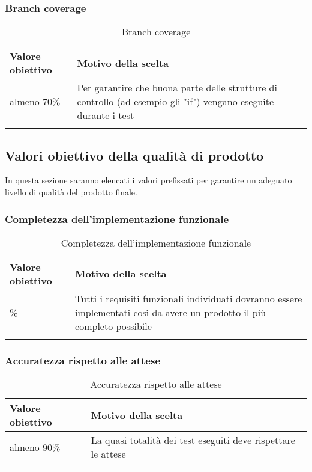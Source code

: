 \documentclass[../PianoDiQualifica_v3.0.0.tex]{subfiles}
\begin{document}
		\subsubsection{Branch coverage}
			\begin{longtable}[c] { >{\centering\arraybackslash}p{4cm} p{7cm} }
				\toprule
				\centerline{\textbf{Valore obiettivo}} & \centerline{\textbf{Motivo della scelta}} \\
				\midrule
					almeno 70\% & Per garantire che buona parte delle strutture di controllo (ad esempio gli "if") vengano eseguite durante i test \\
				\bottomrule
				\caption{Branch coverage}
			\end{longtable}


	\subsection{Valori obiettivo della qualità di prodotto}
		In questa sezione saranno elencati i valori prefissati per garantire un adeguato livello di qualità del prodotto finale.

		\subsubsection{Completezza dell'implementazione funzionale}
			\begin{longtable}[c] { >{\centering\arraybackslash}p{4cm} p{7cm} }
				\toprule
				\centerline{\textbf{Valore obiettivo}} & \centerline{\textbf{Motivo della scelta}} \\
				\midrule
					100\% &	Tutti i requisiti funzionali individuati dovranno essere implementati così da avere un prodotto il più completo possibile\\
				\bottomrule
				\caption{Completezza dell'implementazione funzionale}
			\end{longtable}

		\subsubsection{Accuratezza rispetto alle attese}
			\begin{longtable}[c] { >{\centering\arraybackslash}p{4cm} p{7cm} }
				\toprule
				\centerline{\textbf{Valore obiettivo}} & \centerline{\textbf{Motivo della scelta}} \\
				\midrule
					almeno 90\% & La quasi totalità dei test eseguiti deve rispettare le attese \\
				\bottomrule
				\caption{Accuratezza rispetto alle attese}
			\end{longtable}
\end{document}

